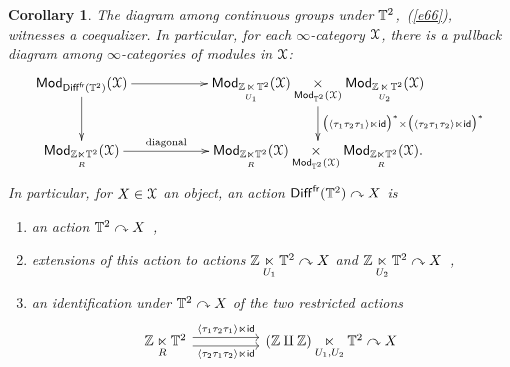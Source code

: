 \documentclass{amsart}
\newtheorem{cor}[theorem]{Corollary}
\theoremstyle{definition}
\theoremstyle{remark}
\DeclareMathOperator{\Mod}{\sf Mod}
\newcommand{\lacts}{\curvearrowright}
\DeclareMathOperator{\Diff}{{\sf Diff}}
\DeclareMathOperator{\fr}{\sf fr}
\newcommand{\lag}{\langle}
\newcommand{\rag}{\rangle}
\DeclareMathOperator{\id}{\sf id}
\begin{document}
\begin{cor}
\label{t49}
The diagram among continuous groups under $\mathbb T^2$,~(\ref{e66}), 
witnesses a coequalizer.
In particular, for each $\infty$-category $\mathcal X$, there is a pullback diagram among $\infty$-categories of modules in $\mathcal X$:
\[
\xymatrix{
\Mod_{\Diff^{\fr}(\TT^2)}(\cX)
\ar[rr]
\ar[d]
&&
\Mod_{\ZZ \underset{U_1} \ltimes \TT^2}(\cX)
\underset{\Mod_{\TT^2}(\cX)}\times
\Mod_{\ZZ  \underset{U_2} \ltimes \TT^2}(\cX)
\ar[d]^-{\bigl(\lag \tau_{1} \tau_{2} \tau_{1}\rag \ltimes \id \bigr)^\ast \times \bigl(\lag \tau_{2} \tau_{1} \tau_{2}\rag \ltimes \id \bigr)^\ast}
\\
\Mod_{\ZZ \underset{R} \ltimes \TT^2}(\cX)
\ar[rr]^-{\rm diagonal}
&&
\Mod_{ \ZZ \underset{R} \ltimes \TT^2}(\cX)
\underset{\Mod_{\TT^2}(\cX)}\times
\Mod_{\ZZ \underset{R} \ltimes \TT^2}(\cX)
.
}
\]
In particular, for $X\in \mathcal X$ an object, an action $\Diff^{\fr}(\TT^2) \lacts X$ is 
\begin{enumerate}
\item
an action $\TT^2\lacts X$~,

\item
extensions of this action to actions $\ZZ \underset{U_1}\ltimes \TT^2 \lacts X$ and $\ZZ \underset{U_2} \ltimes \TT^2  \lacts X$~,

\item
an identification under $\TT^2 \lacts X$ of the two restricted actions
\[
\begin{tikzcd}
\ZZ \underset{R}\ltimes \TT^2 \arrow[rr, yshift=0.7ex, "\lag \tau_{1} \tau_{2} \tau_{1}\rag \ltimes \id "] \arrow[swap, rr, yshift=-0.7ex, "\lag \tau_{2} \tau_{1} \tau_{2}\rag \ltimes \id "]
&
&
(\ZZ \amalg \ZZ) \underset{U_1, U_2}\ltimes \TT^2  \lacts X
\end{tikzcd}
\]


\end{enumerate}


\end{cor}
\end{document}
